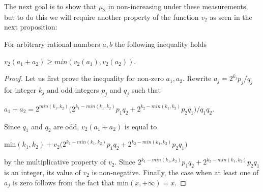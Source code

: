 \documentclass[12pt]{dalthesis}
\begin{document}
The next goal is to show that $\mu_2$ in non-increasing under these measurements, but to do this we will require another property of the function $v_2$ as seen in the next proposition:

\begin{proposition}
\label{prop6.4}
For arbitrary rational numbers $a, b$ the following inequality holds
\begin{center}
$v_2 (a_1 + a_2) \geq min(v_2 (a_1), v_2(a_2))$.
\end{center} 
\end{proposition}
\begin{proof}
Let us first prove the inequality for non-zero $a_1, a_2$. Rewrite $a_j = 2^{k_j}p_j/q_j$ for integer $k_j$ and odd integers $p_j$ and $q_j$ such that
\begin{center}
$a_1 + a_2 = 2^{min(k_1, k_2)} \big( 2^{k_1 - min(k_1, k_2)} p_1q_2 + 2^{k_2 - min(k_1, k_2)}p_2q_1 \big) /q_1q_2$.
\end{center}
Since $q_1$ and $q_2$ are odd, $v_2 (a_1 + a_2)$ is equal to
\begin{center}
min$(k_1, k_2) + v_2 \big( 2^{k_1 - min(k_1, k_2)} p_1q_2 + 2^{k_2 - min(k_1, k_2)}p_2q_1 \big)$
\end{center}
by the multiplicative property of $v_2$. Since $2^{k_1 - min(k_1, k_2)} p_1q_2 + 2^{k_2 - min(k_1, k_2)}p_2q_1$ is an integer, its value of $v_2$ is non-negative. Finally, the case when at least one of $a_j$ is zero follows from the fact that min$(x, +\infty) = x$.
\end{proof}
\end{document}
